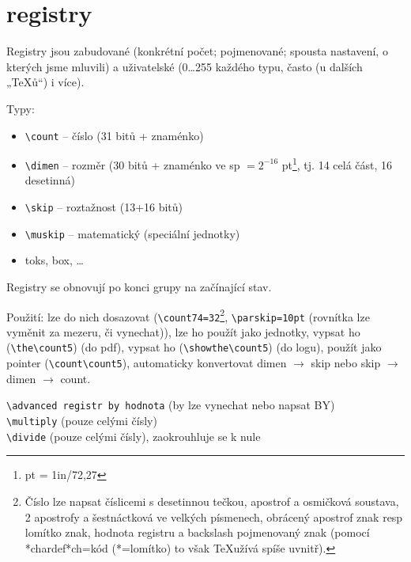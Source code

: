 \documentclass[12pt]{article}					%
\begin{document}
\section{registry}
    \begin{definice}
        Registry jsou zabudované (konkrétní počet; pojmenované; spousta nastavení, o kterých jsme mluvili) a uživatelské (0…255 každého typu, často (u dalších „TeXů“) i více).

        Typy:
        \begin{itemize}
            \item \verb|\count| -- číslo (31 bitů + znaménko)
            \item \verb|\dimen| -- rozměr (30 bitů + znaménko ve sp $= 2^{-16}$ pt\footnote{pt = 1in/72,27}, tj. 14 celá část, 16 desetinná)
            \item \verb|\skip| -- roztažnost (13+16 bitů)
            \item \verb|\muskip| -- matematický (speciální jednotky)
            \item toks, box, …
        \end{itemize}

        Registry se obnovují po konci grupy na začínající stav.

        Použití: lze do nich dosazovat (\verb|\count74=32|\footnote{Číslo lze napsat číslicemi s desetinnou tečkou, apostrof a osmičková soustava, 2 apostrofy a šestnáctková ve velkých písmenech, obrácený apostrof znak resp lomítko znak, hodnota registru a backslash pojmenovaný znak (pomocí *chardef*ch=kód (*=lomítko) to však \TeX užívá spíše uvnitř).}, \verb|\parskip=10pt| (rovnítka lze vyměnit za mezeru, či vynechat)), lze ho použít jako jednotky, vypsat ho (\verb|\the\count5|) (do pdf), vypsat ho (\verb|\showthe\count5|) (do logu), použít jako pointer (\verb|\count\count5|), automaticky konvertovat dimen $\rightarrow$ skip nebo skip $\rightarrow$ dimen $\rightarrow$ count. 
    \end{definice}

    \begin{definice}[Aritmetika]
        \verb|\advanced registr by hodnota| (by lze vynechat nebo napsat BY)\\
        \verb|\multiply| (pouze celými čísly)\\
        \verb|\divide| (pouze celými čísly), zaokrouhluje se k nule
    \end{definice}
\end{document}
